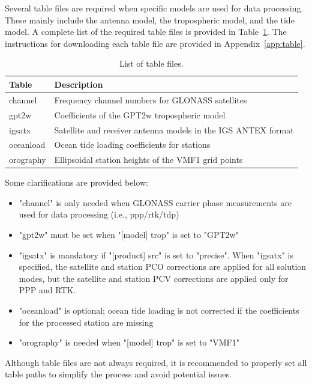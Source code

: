 Several table files are required when specific models are used for data processing.
These mainly include the antenna model, the tropospheric model, and the tide model.
A complete list of the required table files is provided in Table~\ref{tab:table}.
The instructions for downloading each table file are provided in Appendix~\ref{app:table}.

\begin{table}[!hbt]
    \centering
    \caption{List of table files.}
    \label{tab:table}
    \begin{tabular}{ll}
    \toprule
        Table & Description \\
    \midrule
        channel & Frequency channel numbers for GLONASS satellites \\
        gpt2w & Coefficients of the GPT2w tropospheric model \\
        igsatx & Satellite and receiver antenna models in the IGS ANTEX format \\
        oceanload & Ocean tide loading coefficients for stations \\
        orography & Ellipsoidal station heights of the VMF1 grid points \\
    \bottomrule
    \end{tabular}
\end{table}

Some clarifications are provided below:

\begin{itemize}[]
    \item "channel" is only needed when GLONASS carrier phase measurements are used for data
          processing (i.e., ppp/rtk/tdp)
    \item "gpt2w" must be set when "[model] trop" is set to "GPT2w"
    \item "igsatx" is mandatory if "[product] src" is set to "precise".
          When "igsatx" is specified, the satellite and station PCO corrections are applied for
          all solution modes, but the satellite and station PCV corrections are applied only for
          PPP and RTK.
    \item "oceanload" is optional; ocean tide loading is not corrected
          if the coefficients for the processed station are missing
    \item "orography" is needed when "[model] trop" is set to "VMF1"
\end{itemize}

Although table files are not always required, it is recommended to properly set all table paths
to simplify the process and avoid potential issues.



